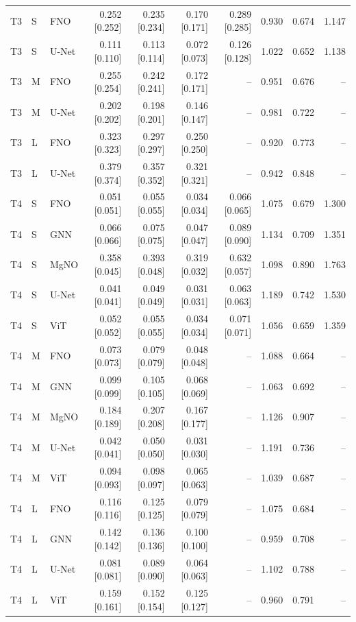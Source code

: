\begin{table}[tb]
\begin{tabular}{lllrrrrrrr}
T3 & S & FNO & 0.252 [0.252] & 0.235 [0.234] & 0.170 [0.171] & 0.289 [0.285] & 0.930 & 0.674 & 1.147 \\
T3 & S & U-Net & 0.111 [0.110] & 0.113 [0.114] & 0.072 [0.073] & 0.126 [0.128] & 1.022 & 0.652 & 1.138 \\
T3 & M & FNO & 0.255 [0.254] & 0.242 [0.241] & 0.172 [0.171] & -- & 0.951 & 0.676 & -- \\
T3 & M & U-Net & 0.202 [0.202] & 0.198 [0.201] & 0.146 [0.147] & -- & 0.981 & 0.722 & -- \\
T3 & L & FNO & 0.323 [0.323] & 0.297 [0.297] & 0.250 [0.250] & -- & 0.920 & 0.773 & -- \\
T3 & L & U-Net & 0.379 [0.374] & 0.357 [0.352] & 0.321 [0.321] & -- & 0.942 & 0.848 & -- \\
T4 & S & FNO & 0.051 [0.051] & 0.055 [0.055] & 0.034 [0.034] & 0.066 [0.065] & 1.075 & 0.679 & 1.300 \\
T4 & S & GNN & 0.066 [0.066] & 0.075 [0.075] & 0.047 [0.047] & 0.089 [0.090] & 1.134 & 0.709 & 1.351 \\
T4 & S & MgNO & 0.358 [0.045] & 0.393 [0.048] & 0.319 [0.032] & 0.632 [0.057] & 1.098 & 0.890 & 1.763 \\
T4 & S & U-Net & 0.041 [0.041] & 0.049 [0.049] & 0.031 [0.031] & 0.063 [0.063] & 1.189 & 0.742 & 1.530 \\
T4 & S & ViT & 0.052 [0.052] & 0.055 [0.055] & 0.034 [0.034] & 0.071 [0.071] & 1.056 & 0.659 & 1.359 \\
T4 & M & FNO & 0.073 [0.073] & 0.079 [0.079] & 0.048 [0.048] & -- & 1.088 & 0.664 & -- \\
T4 & M & GNN & 0.099 [0.099] & 0.105 [0.105] & 0.068 [0.069] & -- & 1.063 & 0.692 & -- \\
T4 & M & MgNO & 0.184 [0.189] & 0.207 [0.208] & 0.167 [0.177] & -- & 1.126 & 0.907 & -- \\
T4 & M & U-Net & 0.042 [0.041] & 0.050 [0.050] & 0.031 [0.030] & -- & 1.191 & 0.736 & -- \\
T4 & M & ViT & 0.094 [0.093] & 0.098 [0.097] & 0.065 [0.063] & -- & 1.039 & 0.687 & -- \\
T4 & L & FNO & 0.116 [0.116] & 0.125 [0.125] & 0.079 [0.079] & -- & 1.075 & 0.684 & -- \\
T4 & L & GNN & 0.142 [0.142] & 0.136 [0.136] & 0.100 [0.100] & -- & 0.959 & 0.708 & -- \\
T4 & L & U-Net & 0.081 [0.081] & 0.089 [0.090] & 0.064 [0.063] & -- & 1.102 & 0.788 & -- \\
T4 & L & ViT & 0.159 [0.161] & 0.152 [0.154] & 0.125 [0.127] & -- & 0.960 & 0.791 & -- \\
\bottomrule
\end{tabular}
\end{table}
